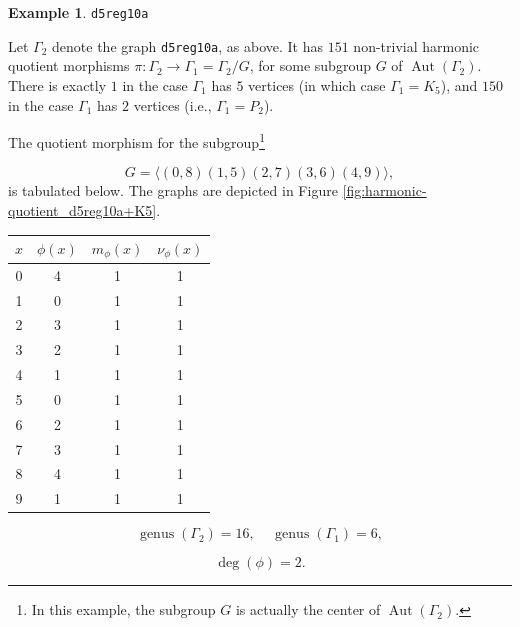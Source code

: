 \documentclass[12pt,letterpaper]{article}
\theoremstyle{definition}
\newtheorem{example}[theorem]{Example}
\DeclareMathOperator{\Aut}{Aut}
\DeclareMathOperator{\genus}{genus}
\begin{document}
\begin{example}%
\label{example:d5reg10a}
  {\tt d5reg10a}\newline
{\rm  
  Let $\Gamma_2$ denote the graph {\tt d5reg10a}, as above.
It has $151$  non-trivial harmonic quotient morphisms
$\pi: \Gamma_2\to \Gamma_1=\Gamma_2/G$,
for some subgroup $G$ of $\Aut(\Gamma_2)$.
There is exactly $1$ in the case $\Gamma_1$ has $5$ vertices
(in which case $\Gamma_1=K_5$),
and $150$ in the case $\Gamma_1$ has $2$ vertices
(i.e., $\Gamma_1=P_2$).

The quotient morphism for the
subgroup\footnote{In this example, the subgroup $G$
is actually the center of $\Aut(\Gamma_2)$.}

\[
G=\langle (0,8)(1,5)(2,7)(3,6)(4,9) \rangle,
\]
is tabulated below. The graphs are depicted in
Figure \ref{fig:harmonic-quotient_d5reg10a+K5}.

\begin{center}
\begin{tabular}{c|c|c|c}  
  $x$ & $\phi(x)$ & $m_\phi(x)$ & $\nu_\phi(x)$ \\ \hline
  0   &    4   &        1         &  1   \\ 
  1   &    0   &        1         &  1  \\ 
  2   &    3   &        1         &  1  \\ 
  3   &    2   &        1         &  1  \\ 
  4   &    1   &        1         &  1   \\ 
  5   &    0   &        1         &  1    \\ 
  6   &    2   &        1         &  1   \\ 
  7   &    3   &        1         &  1   \\
  8   &    4   &        1         &  1   \\
  9   &    1   &        1         &  1   \\
\end{tabular}
\end{center}

\[
  \genus(\Gamma_2) =16,\ \ \ \ \
  \genus(\Gamma_1) =6,
\]

\[
\deg(\phi) =2.
\]

}
\end{example}
\end{document}
